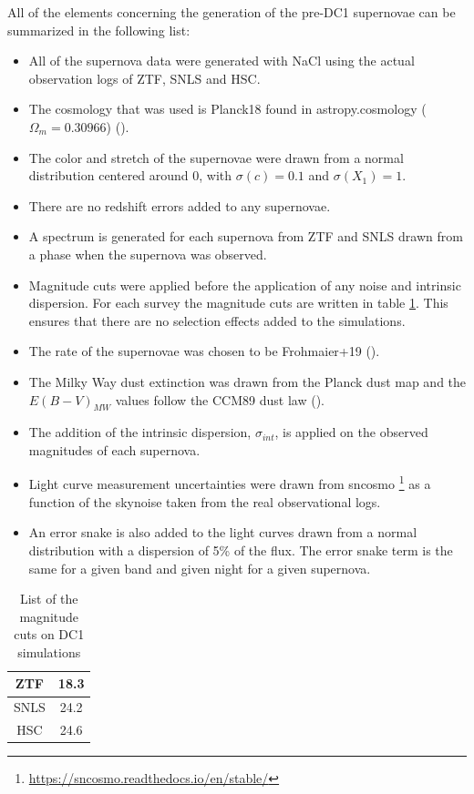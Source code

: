 All of the elements concerning the generation of the pre-DC1 supernovae can be summarized in the following list: 
\begin{itemize}
    \item All of the supernova data were generated with NaCl using the actual observation logs of ZTF, SNLS and HSC.
    \item The cosmology that was used is Planck18 found in astropy.cosmology ($\Omega_m=0.30966$) (\cite{Planck_2018_params}).
    \item The color and stretch of the supernovae were drawn from a normal distribution centered around 0, with $\sigma(c) = 0.1$ and $\sigma(X_1) = 1$.
    \item There are no redshift errors added to any supernovae.
    \item A spectrum is generated for each supernova from ZTF and SNLS drawn from a phase when the supernova was observed.
    \item Magnitude cuts were applied before the application of any noise and intrinsic dispersion. For each survey the magnitude cuts are written in table \ref{tab:mag_cuts}. This ensures that there are no selection effects added to the simulations.
    \item The rate of the supernovae was chosen to be Frohmaier+19 (\cite{Frohmaier_2019}).
    \item The Milky Way dust extinction was drawn from the Planck dust map and the $E(B-V)_{MW}$ values follow the CCM89 dust law (\cite{Cardelli_1989}).
    \item The addition of the intrinsic dispersion, $\sigma_{int}$, is applied on the observed magnitudes of each supernova.
    \item Light curve measurement uncertainties were drawn from sncosmo \footnote{\url{https://sncosmo.readthedocs.io/en/stable/}} as a function of the skynoise taken from the real observational logs.
    \item An error snake is also added to the light curves drawn from a normal distribution with a dispersion of 5\% of the flux. The error snake term is the same for a given band and given night for a given supernova.
\end{itemize}

\begin{table}[ht]
    \centering
    \begin{tabular}{ c  c }
    \hline
        ZTF & 18.3 \\
        \hline
        SNLS & 24.2 \\
        \hline
        HSC & 24.6 \\
    \hline
    \end{tabular}
    \caption{List of the magnitude cuts on DC1 simulations}
    \label{tab:mag_cuts}
\end{table}


